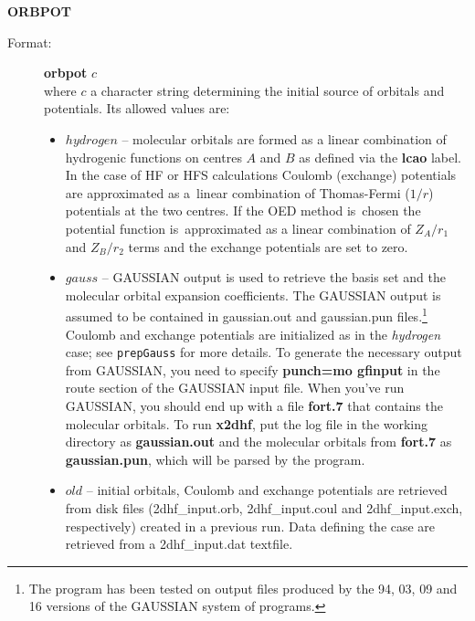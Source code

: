 \documentclass[12pt,a4paper]{article}
\newcommand{\ft}[1]{\texttt{#1}}
\begin{document}
\begin{description}
\item \textbf{ORBPOT}
\begin{description}
\item[Format:] \textbf{orbpot} $c$\\
  where $c$ a character string determining the initial source of
  orbitals and potentials. Its allowed values are:
\begin{itemize}
\item $hydrogen$ -- molecular orbitals are formed as a linear combination of hydrogenic
  functions on centres $A$ and $B$ as defined via the \textbf{lcao} label. In the case of
  HF or HFS calculations Coulomb (exchange) potentials are approximated as a~linear
  combination of Thomas-Fermi ($1/r$) potentials at the two centres. If the OED method
  is~chosen the potential function is~approximated as a linear combination of $Z_A/r_1$
  and $Z_B/r_2$ terms and the exchange potentials are set to zero.

\item $gauss$ -- GAUSSIAN output is used to retrieve the basis set and
  the molecular orbital expansion coefficients. The GAUSSIAN output is
  assumed to be contained in gaussian.out and gaussian.pun
  files.\footnote{The program has been tested on output files produced
    by the 94, 03, 09 and 16 versions of the GAUSSIAN system of
    programs.} Coulomb and exchange potentials are initialized as in
  the \textsl{hydrogen} case; see \ft{prepGauss} for more details.
  To generate the necessary output from GAUSSIAN, you need to specify
  {\bf punch=mo gfinput} in the route section of the GAUSSIAN input
  file. When you've run GAUSSIAN, you should end up with a file {\bf
    fort.7} that contains the molecular orbitals. To run {\bf x2dhf},
  put the log file in the working directory as {\bf gaussian.out} and
  the molecular orbitals from {\bf fort.7} as {\bf gaussian.pun},
  which will be parsed by the program.

\item $old$ -- initial orbitals, Coulomb and exchange potentials are retrieved from disk
  files (2dhf\_\-input.\-orb, 2dhf\_\-input.\-coul and 2dhf\_input.exch, respectively) created in
  a previous run. Data defining the case are retrieved from a 2dhf\_input.\-dat textfile.


\end{itemize}
\end{description}
\end{description}
\end{document}
